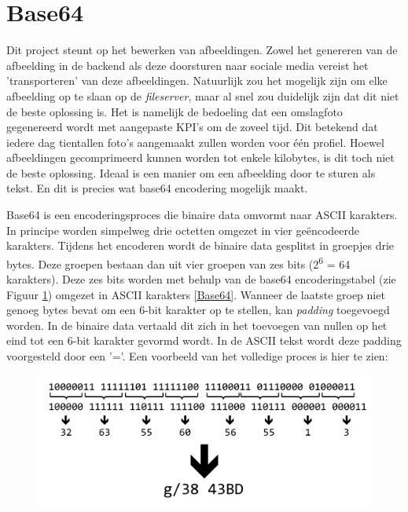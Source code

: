 \newpage
\section{Base64}
Dit project steunt op het bewerken van afbeeldingen. Zowel het genereren van de afbeelding in de backend als deze doorsturen naar sociale media vereist het 'transporteren' van deze afbeeldingen. Natuurlijk zou het mogelijk zijn om elke afbeelding op te slaan op de \textit{fileserver}, maar al snel zou duidelijk zijn dat dit niet de beste oplossing is. Het is namelijk de bedoeling dat een omslagfoto gegenereerd wordt met aangepaste KPI's om de zoveel tijd. Dit betekend dat iedere dag tientallen foto's aangemaakt zullen worden voor \'{e}\'{e}n profiel. Hoewel afbeeldingen gecomprimeerd kunnen worden tot enkele kilobytes, is dit toch niet de beste oplossing. Ideaal is een manier om een afbeelding door te sturen als tekst. En dit is precies wat base64 encodering mogelijk maakt. 

Base64 is een encoderingsproces die binaire data omvormt naar ASCII karakters. %
In principe worden simpelweg drie octetten omgezet in vier ge\"{e}ncodeerde karakters. Tijdens het encoderen wordt de binaire data gesplitst in groepjes drie bytes. Deze groepen bestaan dan uit vier groepen van zes bits (2\textsuperscript{6} = 64 karakters). Deze zes bits worden met behulp van de base64 encoderingstabel (zie Figuur \ref{fig:Base64Table}) omgezet in ASCII karakters \ref{Base64}. Wanneer de laatste groep niet genoeg bytes bevat om een 6-bit karakter op te stellen, kan \textit{padding} toegevoegd worden. In de binaire data vertaald dit zich in het toevoegen van nullen op het eind tot een 6-bit karakter gevormd wordt. In de ASCII tekst wordt deze padding voorgesteld door een '='. Een voorbeeld van het volledige proces is hier te zien: 

\begin{figure}[H]
	\centering
	\includegraphics[width=1\textwidth]{Figuren/Base64Process.png}
	\label{fig:Base64Table}
\end{figure}

